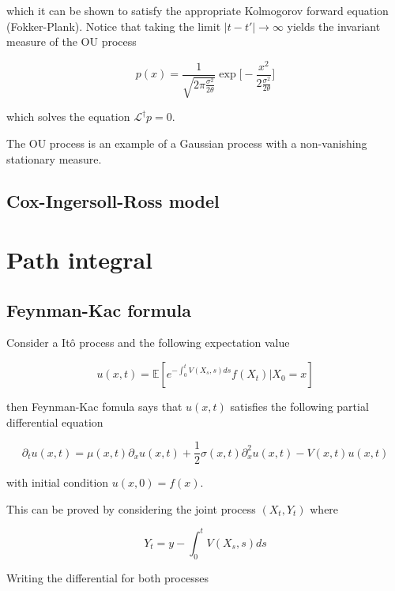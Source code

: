 \documentclass[11pt,a4paper]{article}
\begin{document}
which it can be shown to satisfy the appropriate Kolmogorov forward equation (Fokker-Plank). Notice that taking the limit $|t-t'|\to \infty$ yields the invariant measure of the OU process

\begin{equation}
    p(x) = \frac{1}{\sqrt{2\pi \frac{\sigma^2}{2\theta}}}\exp\Biggl[-\frac{x^2}{2\frac{\sigma^2}{2\theta}}\Biggl]
\end{equation}

which solves the equation $\mathcal{L}^{\dagger}p = 0$.

The OU process is an example of a Gaussian process with a non-vanishing stationary measure.

\subsection{Cox-Ingersoll-Ross model}


\section{Path integral}

\subsection{Feynman-Kac formula}

Consider a It\^{o} process and the following expectation value

\begin{equation}
    u(x,t) = \mathbb{E}[e^{-\int_0^t V(X_s,s)ds}f(X_t)|X_0=x]
\end{equation}

then Feynman-Kac fomula says that $u(x,t)$ satisfies the following partial differential equation

\begin{equation}
    \partial_tu(x,t) = \mu(x,t)\partial_xu(x,t) +\frac{1}{2}\sigma(x,t)\partial^2_xu(x,t)-V(x,t)u(x,t)
\end{equation}

with initial condition $u(x,0) = f(x)$.

This can be proved by considering the joint process $(X_t,Y_t)$ where 

\begin{equation}
    Y_t = y-\int_0^t V(X_s,s)ds
\end{equation}

Writing the differential for both processes
\end{document}
